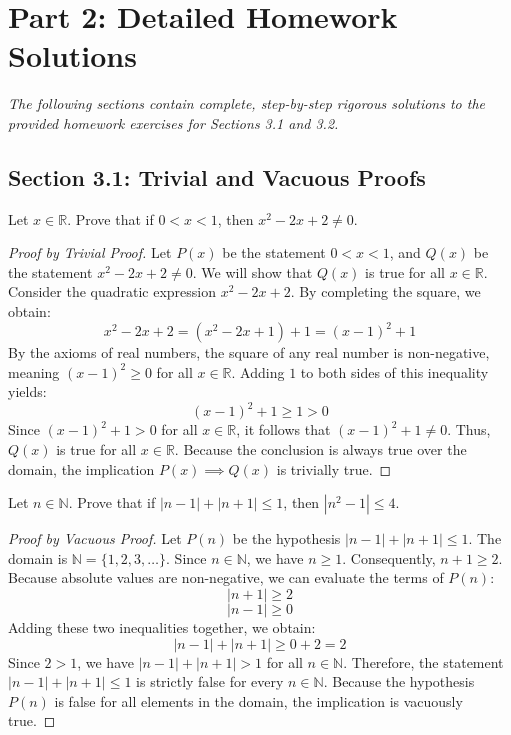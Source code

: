 \documentclass[11pt]{article}
\theoremstyle{remark}
\begin{document}
\newpage
\section{Part 2: Detailed Homework Solutions}
\textit{The following sections contain complete, step-by-step rigorous solutions to the provided homework exercises for Sections 3.1 and 3.2.}

\subsection{Section 3.1: Trivial and Vacuous Proofs}

\begin{problem}[3.1]
Let $x \in \mathbb{R}$. Prove that if $0 < x < 1$, then $x^2 - 2x + 2 \neq 0$.
\end{problem}
\begin{proof}[Proof by Trivial Proof]
Let $P(x)$ be the statement $0 < x < 1$, and $Q(x)$ be the statement $x^2 - 2x + 2 \neq 0$. We will show that $Q(x)$ is true for all $x \in \mathbb{R}$. 
Consider the quadratic expression $x^2 - 2x + 2$. By completing the square, we obtain:
\[ x^2 - 2x + 2 = (x^2 - 2x + 1) + 1 = (x - 1)^2 + 1 \]
By the axioms of real numbers, the square of any real number is non-negative, meaning $(x - 1)^2 \ge 0$ for all $x \in \mathbb{R}$.
Adding $1$ to both sides of this inequality yields:
\[ (x - 1)^2 + 1 \ge 1 > 0 \]
Since $(x - 1)^2 + 1 > 0$ for all $x \in \mathbb{R}$, it follows that $(x - 1)^2 + 1 \neq 0$. 
Thus, $Q(x)$ is true for all $x \in \mathbb{R}$. Because the conclusion is always true over the domain, the implication $P(x) \implies Q(x)$ is trivially true.
\end{proof}

\begin{problem}[3.2]
Let $n \in \mathbb{N}$. Prove that if $|n - 1| + |n + 1| \le 1$, then $|n^2 - 1| \le 4$.
\end{problem}
\begin{proof}[Proof by Vacuous Proof]
Let $P(n)$ be the hypothesis $|n - 1| + |n + 1| \le 1$. The domain is $\mathbb{N} = \{1, 2, 3, \dots\}$.
Since $n \in \mathbb{N}$, we have $n \ge 1$. 
Consequently, $n + 1 \ge 2$. Because absolute values are non-negative, we can evaluate the terms of $P(n)$:
\[ |n + 1| \ge 2 \]
\[ |n - 1| \ge 0 \]
Adding these two inequalities together, we obtain:
\[ |n - 1| + |n + 1| \ge 0 + 2 = 2 \]
Since $2 > 1$, we have $|n - 1| + |n + 1| > 1$ for all $n \in \mathbb{N}$. 
Therefore, the statement $|n - 1| + |n + 1| \le 1$ is strictly false for every $n \in \mathbb{N}$. Because the hypothesis $P(n)$ is false for all elements in the domain, the implication is vacuously true.
\end{proof}
\end{document}
